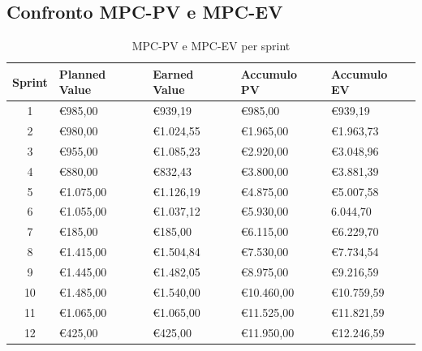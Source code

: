 \documentclass[a4paper, 10pt, colorlinks=true, linkcolor=black, urlcolor=blue, citecolor=blue, hidelinks]{article}
\begin{document}
\subsection{Confronto MPC-PV e MPC-EV}
\begin{table}[H]
    \centering
	\begin{tabular}{|c|l|l|l|l|}
		\hline
		\textbf{Sprint} & \textbf{Planned Value} & \textbf{Earned Value} & \textbf{Accumulo PV} & \textbf{Accumulo EV} \\
		\hline
		1 & €985,00 & €939,19 & €985,00 & €939,19 \\ 
		\hline
        2 & €980,00 & €1.024,55 & €1.965,00 & €1.963,73 \\
        \hline
        3 & €955,00 & €1.085,23 & €2.920,00 & €3.048,96 \\
        \hline
        4 & €880,00 & €832,43 & €3.800,00 & €3.881,39 \\
        \hline
        5 & €1.075,00 & €1.126,19 & €4.875,00 & €5.007,58 \\
        \hline
        6 & €1.055,00 & €1.037,12 & €5.930,00 & 6.044,70 \\
        \hline
        7 & €185,00 & €185,00 & €6.115,00 & €6.229,70 \\
        \hline
        8 & €1.415,00 & €1.504,84 & €7.530,00 & €7.734,54 \\
        \hline
        9 & €1.445,00 & €1.482,05 & €8.975,00 & €9.216,59 \\
        \hline
        10 & €1.485,00 & €1.540,00 & €10.460,00 & €10.759,59 \\
        \hline
        11 & €1.065,00 & €1.065,00 & €11.525,00 & €11.821,59 \\
        \hline
        12 & €425,00 & €425,00 & €11.950,00 & €12.246,59 \\
        \hline
	\end{tabular}
	\caption{MPC-PV e MPC-EV per sprint}
	\label{tab:pv-ev}
\end{table}
\end{document}
